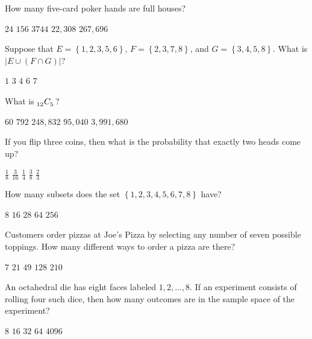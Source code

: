 \documentclass[answers,12pt]{exam}
\newcommand\ncr[2]{\tensor[_{#1}]C{_{#2}}}
\begin{document}
\begin{questions}
\question How many five-card poker hands are full houses?\\
\begin{oneparchoices}
\choice $24$ %
\choice $156$ %
\correctchoice $3744$
\choice $22,308$ %
\choice $267,696$ %
\end{oneparchoices}

\question Suppose that $E=\left\{1,2,3,5,6\right\}$,
$F=\left\{2,3,7,8\right\}$, and $G=\left\{3,4,5,8\right\}$.
What is $\left|E\cup\left(F\cap G\right)\right|$?\\
\begin{oneparchoices}
\choice $1$
\choice $3$ %
\choice $4$
\correctchoice $6$
\choice $7$
\end{oneparchoices}

\question What is $\ncr{12}{5}$?\\
\begin{oneparchoices}
\choice $60$ %
\correctchoice $792$
\choice $248,832$ %
\choice $95,040$ %
\choice $3,991,680$ %
\end{oneparchoices}

\question If you flip three coins, then what is the probability
that exactly two heads come up?\\
\begin{oneparchoices}
\choice $\frac{1}{8}$ %
\choice $\frac{3}{16}$ %
\choice $\frac{1}{4}$ %
\correctchoice $\frac{3}{8}$
\choice $\frac{2}{3}$ %
\end{oneparchoices}

\question How many subsets does the set
$\left\{1,2,3,4,5,6,7,8\right\}$ have?\\
\begin{oneparchoices}
\choice $8$ %
\choice $16$ %
\choice $28$ %
\choice $64$ %
\correctchoice $256$
\end{oneparchoices}

\question Customers order pizzas at Joe's Pizza
by selecting any number of seven possible toppings.
How many different ways to order a pizza are there?\\
\begin{oneparchoices}
\choice $7$ %
\choice $21$ %
\choice $49$ %
\correctchoice $128$
\choice $210$ %
\end{oneparchoices}

\question An octahedral die has eight faces labeled $1,2,\ldots,8$.
If an experiment consists of rolling four such dice, then how
many outcomes are in the sample space of the experiment?\\
\begin{oneparchoices}
\choice $8$ %
\choice $16$
\choice $32$ %
\choice $64$ %
\correctchoice $4096$
\end{oneparchoices}


\end{questions}
\end{document}
